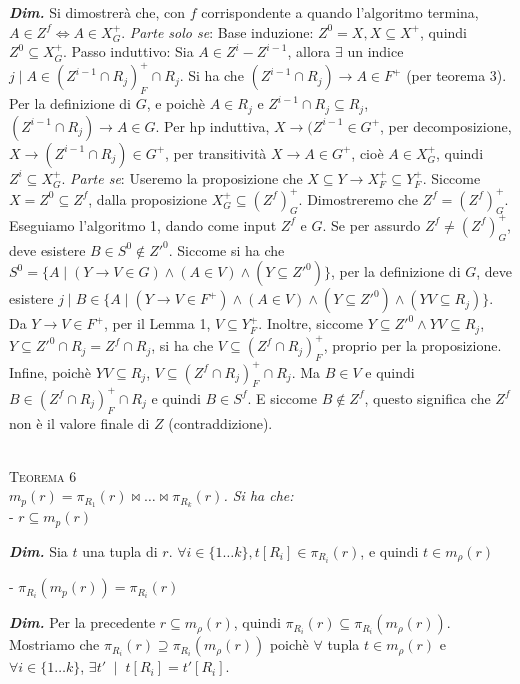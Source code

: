 \documentclass[a4paper,10pt]{article} %
\newcommand{\dimo}[1]{%
    \par \hfill\begin{minipage}{0.99\linewidth}{ \tiny {\textbf{\em{Dim.}}} {#1} }\end{minipage}}
\newcommand{\mtheorem}[1]{%
    {\hspace*{-10pt} \textsc {#1}}}
\begin{document}
        \dimo{
            Si dimostrerà che, con $f$ corrispondente a quando l'algoritmo termina, $A \in Z^f \Leftrightarrow A \in X^+_G$. 
            \emph{Parte solo se}: Base induzione: $Z^0 = X, X \subseteq X^+$, quindi $Z^0 \subseteq X^+_G$. Passo induttivo: Sia $A \in Z^i - Z^{i-1}$, allora $\exists$ un indice $j \; | \; A \in (Z^{i-1} \cap R_j)^+_F \cap R_j$. Si ha che $(Z^{i-1} \cap R_j) \rightarrow A \in F^+$ (per teorema 3). Per la definizione di $G$, e poichè $A \in R_j$ e $Z^{i-1} \cap R_j \subseteq R_j$, $(Z^{i-1} \cap R_j) \rightarrow A \in G$. Per hp induttiva, $X \rightarrow (Z^{i-1} \in G^+$, per decomposizione, $X \rightarrow (Z^{i-1} \cap R_j) \in G^+$, per transitività $X \rightarrow A \in G^+$, cioè $A \in X^+_G$, quindi $Z^i \subseteq X^+_G$.
            \emph{Parte se}: Useremo la proposizione che $X \subseteq Y \rightarrow X^+_F \subseteq Y^+_F$. Siccome $X = Z^0 \subseteq Z^f$, dalla proposizione $X^+_G \subseteq (Z^f)^+_G$. Dimostreremo che $Z^f = (Z^f)^+_G$. Eseguiamo l'algoritmo 1, dando come input $Z^f$ e $G$. Se per assurdo $Z^f \neq (Z^f)^+_G$, deve esistere $B \in S^0 \not \in Z'^0$. Siccome si ha che $S^0 = \{ A \; | \; (Y \rightarrow V \in G) \wedge (A \in V) \wedge (Y \subseteq Z'^0) \}$, per la definizione di $G$, deve esistere $j \; | \; B \in \{ A \; | \; (Y \rightarrow V \in F^+) \wedge (A \in V) \wedge (Y \subseteq Z'^0) \wedge (YV \subseteq R_j) \}$. Da $Y \rightarrow V \in F^+$, per il Lemma 1, $V \subseteq Y^+_F$. Inoltre, siccome $Y \subseteq Z'^0 \wedge YV \subseteq R_j$, $Y \subseteq Z'^0 \cap R_j = Z^f \cap R_j$, si ha che $V \subseteq (Z^f \cap R_j)^+_F$, proprio per la proposizione. Infine, poichè $YV \subseteq R_j$, $V \subseteq (Z^f \cap R_j)^+_F \cap R_j$. Ma $B \in V$ e quindi $B \in (Z^f \cap R_j)^+_F \cap R_j$ e quindi $B \in S^f$. E siccome $B \not \in Z^f$, questo significa che $Z^f$ non è il valore finale di $Z$ (contraddizione).
        }
    \\[1ex]
    \mtheorem {Teorema 6}\\
        \emph{$m_p(r) = \pi_{R_1}(r) \bowtie \ldots \bowtie \pi_{R_k}(r)$. Si ha che:}\\
        - $r \subseteq m_p(r)$
        \dimo{
            Sia $t$ una tupla di $r$. $\forall i \in \{ 1 \ldots k \} , t[R_i] \in \pi_{R_i}(r)$, e quindi $t \in m_{\rho}(r)$
        }
        - $\pi_{R_i}(m_p(r)) = \pi_{R_i}(r)$
        \dimo{
            Per la precedente $r \subseteq m_\rho(r)$, quindi $\pi_{R_i}(r) \subseteq \pi_{R_i}(m_\rho(r))$. Mostriamo che $\pi_{R_i}(r) \supseteq \pi_{R_i}(m_\rho(r))$ poichè $\forall$ tupla $t \in m_\rho(r)$ e $\forall i \in \{ 1 \ldots k \}$, $\exists t'\;\; |\;\; t[R_i] = t'[R_i]$.
        }
\end{document}
